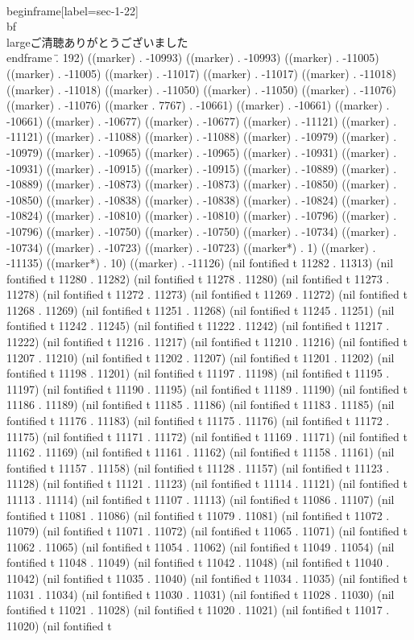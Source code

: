 {{{\\begin{frame}[label=sec-1-22]{}
\\bf\\large{ご清聴ありがとうございました}
\\end{frame}
\" . 192) ((marker) . -10993) ((marker) . -10993) ((marker) . -11005) ((marker) . -11005) ((marker) . -11017) ((marker) . -11017) ((marker) . -11018) ((marker) . -11018) ((marker) . -11050) ((marker) . -11050) ((marker) . -11076) ((marker) . -11076) ((marker . 7767) . -10661) ((marker) . -10661) ((marker) . -10661) ((marker) . -10677) ((marker) . -10677) ((marker) . -11121) ((marker) . -11121) ((marker) . -11088) ((marker) . -11088) ((marker) . -10979) ((marker) . -10979) ((marker) . -10965) ((marker) . -10965) ((marker) . -10931) ((marker) . -10931) ((marker) . -10915) ((marker) . -10915) ((marker) . -10889) ((marker) . -10889) ((marker) . -10873) ((marker) . -10873) ((marker) . -10850) ((marker) . -10850) ((marker) . -10838) ((marker) . -10838) ((marker) . -10824) ((marker) . -10824) ((marker) . -10810) ((marker) . -10810) ((marker) . -10796) ((marker) . -10796) ((marker) . -10750) ((marker) . -10750) ((marker) . -10734) ((marker) . -10734) ((marker) . -10723) ((marker) . -10723) ((marker*) . 1) ((marker) . -11135) ((marker*) . 10) ((marker) . -11126) (nil fontified t 11282 . 11313) (nil fontified t 11280 . 11282) (nil fontified t 11278 . 11280) (nil fontified t 11273 . 11278) (nil fontified t 11272 . 11273) (nil fontified t 11269 . 11272) (nil fontified t 11268 . 11269) (nil fontified t 11251 . 11268) (nil fontified t 11245 . 11251) (nil fontified t 11242 . 11245) (nil fontified t 11222 . 11242) (nil fontified t 11217 . 11222) (nil fontified t 11216 . 11217) (nil fontified t 11210 . 11216) (nil fontified t 11207 . 11210) (nil fontified t 11202 . 11207) (nil fontified t 11201 . 11202) (nil fontified t 11198 . 11201) (nil fontified t 11197 . 11198) (nil fontified t 11195 . 11197) (nil fontified t 11190 . 11195) (nil fontified t 11189 . 11190) (nil fontified t 11186 . 11189) (nil fontified t 11185 . 11186) (nil fontified t 11183 . 11185) (nil fontified t 11176 . 11183) (nil fontified t 11175 . 11176) (nil fontified t 11172 . 11175) (nil fontified t 11171 . 11172) (nil fontified t 11169 . 11171) (nil fontified t 11162 . 11169) (nil fontified t 11161 . 11162) (nil fontified t 11158 . 11161) (nil fontified t 11157 . 11158) (nil fontified t 11128 . 11157) (nil fontified t 11123 . 11128) (nil fontified t 11121 . 11123) (nil fontified t 11114 . 11121) (nil fontified t 11113 . 11114) (nil fontified t 11107 . 11113) (nil fontified t 11086 . 11107) (nil fontified t 11081 . 11086) (nil fontified t 11079 . 11081) (nil fontified t 11072 . 11079) (nil fontified t 11071 . 11072) (nil fontified t 11065 . 11071) (nil fontified t 11062 . 11065) (nil fontified t 11054 . 11062) (nil fontified t 11049 . 11054) (nil fontified t 11048 . 11049) (nil fontified t 11042 . 11048) (nil fontified t 11040 . 11042) (nil fontified t 11035 . 11040) (nil fontified t 11034 . 11035) (nil fontified t 11031 . 11034) (nil fontified t 11030 . 11031) (nil fontified t 11028 . 11030) (nil fontified t 11021 . 11028) (nil fontified t 11020 . 11021) (nil fontified t 11017 . 11020) (nil fontified t }}}
